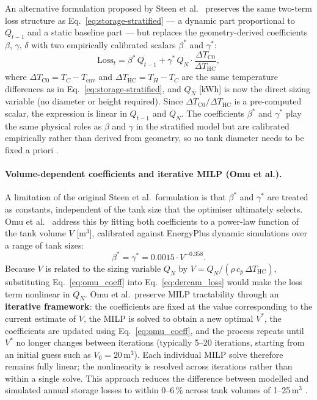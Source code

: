 \documentclass[11pt,a4paper]{report}
\begin{document}
An alternative formulation proposed by Steen et al.~\cite{Steen2015} preserves the same two-term loss structure as Eq.~\eqref{eq:storage-stratified} --- a dynamic part proportional to $Q_{t-1}$ and a static baseline part --- but replaces the geometry-derived coefficients $\beta$, $\gamma$, $\delta$ with two empirically calibrated scalars $\beta^*$ and $\gamma^*$:
\begin{equation}
    \text{Loss}_{t}
    = \beta^*\, Q_{t-1}
    + \gamma^*\, Q_N \cdot \frac{\Delta T_{\text{C0}}}{\Delta T_{\text{HC}}},
    \label{eq:dercam_loss}
\end{equation}
where $\Delta T_{\text{C0}} = T_C - T_{\text{env}}$ and $\Delta T_{\text{HC}} = T_H - T_C$ are the same temperature differences as in Eq.~\eqref{eq:storage-stratified}, and $Q_N$ [kWh] is now the direct sizing variable (no diameter or height required).
Since $\Delta T_{\text{C0}}/\Delta T_{\text{HC}}$ is a pre-computed scalar, the expression is linear in $Q_{t-1}$ and $Q_N$.
The coefficients $\beta^*$ and $\gamma^*$ play the same physical roles as $\beta$ and $\gamma$ in the stratified model but are calibrated empirically rather than derived from geometry, so no tank diameter needs to be fixed a priori \cite{Steen2015}.

\paragraph{Volume-dependent coefficients and iterative MILP (Omu et al.).}
A limitation of the original Steen et al.\ formulation is that $\beta^*$ and $\gamma^*$ are treated as constants, independent of the tank size that the optimiser ultimately selects.
Omu et al.~\cite{Omu2016} address this by fitting both coefficients to a power-law function of the tank volume $V$ [m$^3$], calibrated against EnergyPlus dynamic simulations over a range of tank sizes:
\begin{equation}
    \beta^* = \gamma^* = 0.0015 \cdot V^{-0.358}.
    \label{eq:omu_coeff}
\end{equation}
Because $V$ is related to the sizing variable $Q_N$ by $V = Q_N / (\rho\,c_p\,\Delta T_\text{HC})$, substituting Eq.~\eqref{eq:omu_coeff} into Eq.~\eqref{eq:dercam_loss} would make the loss term nonlinear in $Q_N$.
Omu et al.\ preserve MILP tractability through an \textbf{iterative framework}: the coefficients are fixed at the value corresponding to the current estimate of $V$, the MILP is solved to obtain a new optimal $V^*$, the coefficients are updated using Eq.~\eqref{eq:omu_coeff}, and the process repeats until $V^*$ no longer changes between iterations (typically 5--20 iterations, starting from an initial guess such as $V_0 = 20\,\text{m}^3$).
Each individual MILP solve therefore remains fully linear; the nonlinearity is resolved across iterations rather than within a single solve.
This approach reduces the difference between modelled and simulated annual storage losses to within 0--6\,\% across tank volumes of 1--25\,m$^3$ \cite{Omu2016}.
\end{document}
